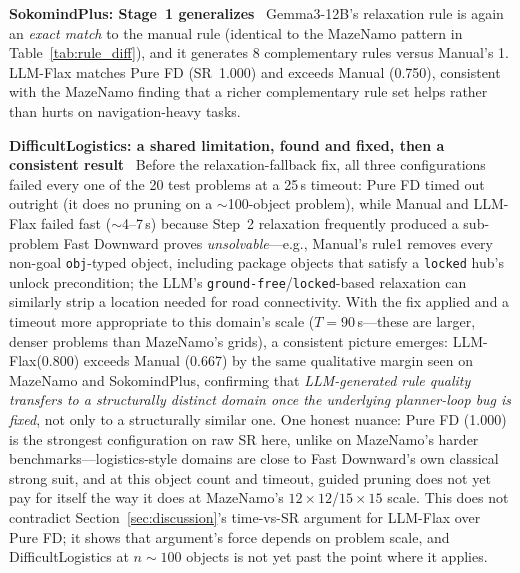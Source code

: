 \documentclass[letterpaper, 10pt, journal, twoside]{IEEEtran}
\newcommand{\sref}[1]{Section~\ref{#1}}
\newcommand{\tref}[1]{Table~\ref{#1}}
\newcommand{\myparagraph}[1]{\noindent\textbf{#1}~}
\newcommand{\method}{LLM-Flax\xspace}
\begin{document}
\myparagraph{SokomindPlus: Stage~1 generalizes}
Gemma3-12B's relaxation rule is again an \emph{exact match} to the manual rule (identical to the MazeNamo pattern in \tref{tab:rule_diff}), and it generates 8 complementary rules versus Manual's 1.
\method matches Pure FD (SR~1.000) and exceeds Manual (0.750), consistent with the MazeNamo finding that a richer complementary rule set helps rather than hurts on navigation-heavy tasks.

\myparagraph{DifficultLogistics: a shared limitation, found and fixed, then a consistent result}
Before the relaxation-fallback fix, all three configurations failed every one of the 20 test problems at a 25\,s timeout: Pure FD timed out outright (it does no pruning on a $\sim$100-object problem), while Manual and \method failed fast ($\sim$4--7\,s) because Step~2 relaxation frequently produced a sub-problem Fast Downward proves \emph{unsolvable}---e.g., Manual's rule1 removes every non-goal \texttt{obj}-typed object, including package objects that satisfy a \texttt{locked} hub's unlock precondition; the LLM's \texttt{ground-free}/\texttt{locked}-based relaxation can similarly strip a location needed for road connectivity.
With the fix applied and a timeout more appropriate to this domain's scale ($T{=}90$\,s---these are larger, denser problems than MazeNamo's grids), a consistent picture emerges: \method (0.800) exceeds Manual (0.667) by the same qualitative margin seen on MazeNamo and SokomindPlus, confirming that \emph{LLM-generated rule quality transfers to a structurally distinct domain once the underlying planner-loop bug is fixed}, not only to a structurally similar one.
One honest nuance: Pure FD (1.000) is the strongest configuration on raw SR here, unlike on MazeNamo's harder benchmarks---logistics-style domains are close to Fast Downward's own classical strong suit, and at this object count and timeout, guided pruning does not yet pay for itself the way it does at MazeNamo's $12{\times}12$/$15{\times}15$ scale.
This does not contradict \sref{sec:discussion}'s time-vs-SR argument for \method over Pure FD; it shows that argument's force depends on problem scale, and DifficultLogistics at $n{\sim}100$ objects is not yet past the point where it applies.
\end{document}
